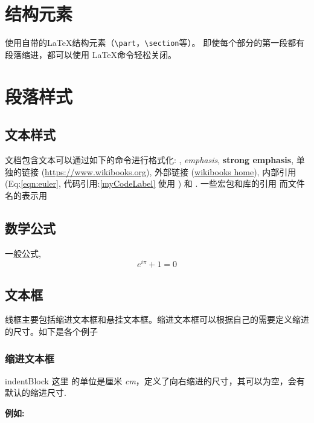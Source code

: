 \documentclass[12pt,a4paper]{report}
\begin{document}
\section{结构元素}
 
使用自带的\LaTeX{}结构元素（\verb|\part|，\verb|\section|等）。 即使每个部分的第一段都有段落缩进，都可以使用  \LaTeX{}命令轻松关闭。
\section{段落样式}

\subsection{文本样式}
文档包含文本可以通过如下的命令进行格式化: , \emph{emphasis}, \textbf{strong emphasis}, 单独的链接 (\url{https://www.wikibooks.org}), 外部链接 (\href{https://www.wikibooks.org}{wikibooks home}), 内部引用(Eq:\ref{eqn:euler}, 代码引用:\ref{myCodeLabel} 使用 ) 和 . 一些宏包和库的引用  而文件名的表示用 

\subsection{数学公式}
一般公式,
\begin{equation}
  e^{i\pi}+1=0
  \label{eqn:euler}
\end{equation}

\subsection{文本框}
线框主要包括缩进文本框和悬挂文本框。缩进文本框可以根据自己的需要定义缩进的尺寸。如下是各个例子
\subsubsection{缩进文本框}
\begin{docCommand}%
	[]{indentBlock}{}
	这里  的单位是厘米 \emph{cm}，定义了向右缩进的尺寸，其可以为空，会有默认的缩进尺寸.
\end{docCommand}
\noindent
\textbf{例如:}	
\end{document}
